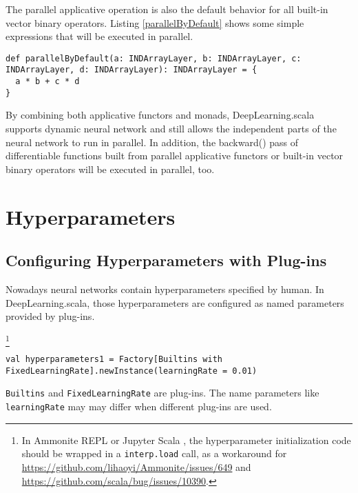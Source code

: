 The parallel applicative operation is also the default behavior for all built-in vector binary operators. Listing \ref{parallelByDefault} shows some simple expressions that will be executed in parallel.

\begin{lstlisting}[float={htbp},caption={By default, \lstinline{a * b} and \lstinline{c * d} will be executed in parallel because they are independent}, label={parallelByDefault}]
def parallelByDefault(a: INDArrayLayer, b: INDArrayLayer, c: INDArrayLayer, d: INDArrayLayer): INDArrayLayer = {
  a * b + c * d
}
\end{lstlisting}

By combining both applicative functors and monads, DeepLearning.scala supports dynamic neural network and still allows the independent parts of the neural network to run in parallel. In addition, the backward() pass of differentiable functions built from parallel applicative functors or built-in vector binary operators will be executed in parallel, too.

\section{Hyperparameters\label{hyperparameters}}

\subsection{Configuring Hyperparameters with Plug-ins}

Nowadays neural networks contain hyperparameters specified by human. In DeepLearning.scala, those hyperparameters are configured as named parameters provided by \glspl{plug-in}.

\footnote{In Ammonite REPL \cite{lihaoyi2017ammonite} or Jupyter Scala \cite{alexarchambault2017jupyter}, the hyperparameter initialization code should be wrapped in a \lstinline{interp.load} call, as a workaround for \url{https://github.com/lihaoyi/Ammonite/issues/649} and \url{https://github.com/scala/bug/issues/10390}.}

\begin{lstlisting}[float={htbp},caption={Configuring hyperparameters with a fixed learning rate}, label={hyperparameters1}]
val hyperparameters1 = Factory[Builtins with FixedLearningRate].newInstance(learningRate = 0.01)
\end{lstlisting}

\lstinline{Builtins} and \lstinline{FixedLearningRate} are \glspl{plug-in}. The name parameters like \lstinline{learningRate} may may differ when different \glspl{plug-in} are used.

